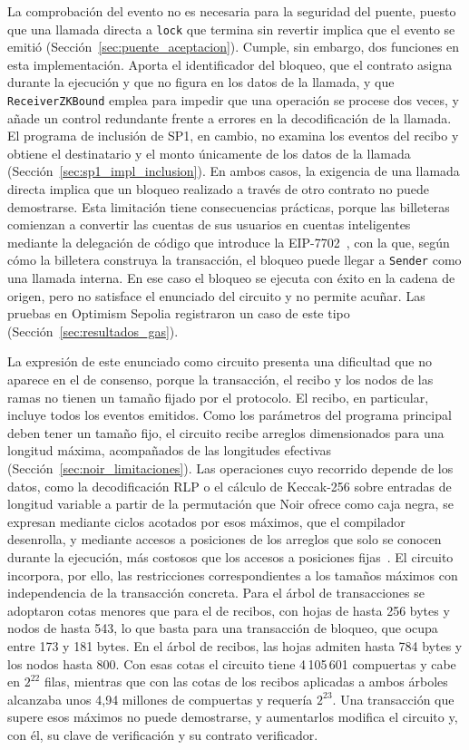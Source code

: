 La comprobación del evento no es necesaria para la seguridad del puente, puesto que una llamada
directa a \texttt{lock} que termina sin revertir implica que el evento se emitió
(Sección~\ref{sec:puente_aceptacion}). Cumple, sin embargo, dos funciones en esta implementación.
Aporta el identificador del bloqueo, que el contrato asigna durante la ejecución y que no figura en
los datos de la llamada, y que \texttt{ReceiverZKBound} emplea para impedir que una operación se
procese dos veces, y añade un control redundante frente a errores en la decodificación de la
llamada. El programa de inclusión de SP1, en cambio, no examina los eventos del recibo y obtiene
el destinatario y el monto únicamente de los datos de la llamada
(Sección~\ref{sec:sp1_impl_inclusion}). En ambos casos, la exigencia de una llamada directa
implica que un bloqueo realizado a través de otro contrato no puede demostrarse. Esta limitación
tiene consecuencias prácticas, porque las billeteras comienzan a convertir las cuentas de sus
usuarios en cuentas inteligentes mediante la delegación de código que introduce la
EIP-7702~\cite{eip7702}, con la que, según cómo la billetera construya la transacción, el bloqueo
puede llegar a \texttt{Sender} como una llamada interna. En ese caso el bloqueo se ejecuta con
éxito en la cadena de origen, pero no satisface el enunciado del circuito y no permite acuñar. Las
pruebas en Optimism Sepolia registraron un caso de este tipo (Sección~\ref{sec:resultados_gas}).

La expresión de este enunciado como circuito presenta una dificultad que no aparece en el de
consenso, porque la transacción, el recibo y los nodos de las ramas no tienen un tamaño fijado por
el protocolo. El recibo, en particular, incluye todos los eventos emitidos. Como los parámetros
del programa principal deben tener un tamaño fijo, el circuito recibe arreglos dimensionados para
una longitud máxima, acompañados de las longitudes efectivas
(Sección~\ref{sec:noir_limitaciones}). Las operaciones cuyo recorrido depende de los datos, como
la decodificación RLP o el cálculo de Keccak-256 sobre entradas de longitud variable a partir de
la permutación que Noir ofrece como caja negra, se expresan mediante ciclos acotados por esos
máximos, que el compilador desenrolla, y mediante accesos a posiciones de los arreglos que solo se
conocen durante la ejecución, más costosos que los accesos a posiciones fijas~\cite{noirdocsbeta}.
El circuito incorpora, por ello, las restricciones correspondientes a los tamaños máximos con
independencia de la transacción concreta. Para el árbol de transacciones se adoptaron cotas
menores que para el de recibos, con hojas de hasta 256 bytes y nodos de hasta 543, lo que basta
para una transacción de bloqueo, que ocupa entre 173 y 181 bytes. En el árbol de recibos, las
hojas admiten hasta 784 bytes y los nodos hasta 800. Con esas cotas el circuito tiene
4\,105\,601 compuertas y cabe en $2^{22}$ filas, mientras que con las cotas de los recibos
aplicadas a ambos árboles alcanzaba unos 4,94 millones de compuertas y requería $2^{23}$.
Una transacción que supere esos máximos no puede demostrarse, y aumentarlos modifica el circuito
y, con él, su clave de verificación y su contrato verificador.


